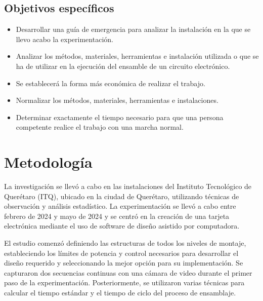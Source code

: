     \subsection{Objetivos específicos }
    
    
    \begin{itemize}
        \item Desarrollar una guía de emergencia para analizar la instalación en la que se llevo acabo la experimentación.
        \item Analizar los métodos, materiales, herramientas e instalación utilizada o que se ha de utilizar en la ejecución del ensamble de un circuito electrónico.
        \item Se establecerá la forma más económica de realizar el trabajo.
        \item Normalizar los métodos, materiales, herramientas e instalaciones.
        \item Determinar exactamente el tiempo necesario para que una persona competente realice el trabajo con una marcha normal.
    \end{itemize}
    \section{Metodología}
    
    La investigación se llevó a cabo en las instalaciones del Instituto Tecnológico de Querétaro (ITQ), ubicado en la ciudad de Querétaro, utilizando técnicas de observación y análisis estadístico. La experimentación se llevó a cabo entre febrero de 2024 y mayo de 2024 y se centró en la creación de una tarjeta electrónica mediante el uso de software de diseño asistido por computadora.
    
    El estudio comenzó definiendo las estructuras de todos los niveles de montaje, estableciendo los límites de potencia y control necesarios para desarrollar el diseño requerido y seleccionando la mejor opción para su implementación. Se capturaron dos secuencias continuas con una cámara de video durante el primer paso de la experimentación. Posteriormente, se utilizaron varias técnicas para calcular el tiempo estándar y el tiempo de ciclo del proceso de ensamblaje.
    
